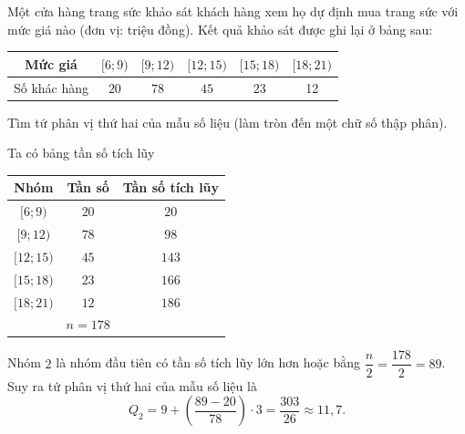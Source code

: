 \begin{bt}%
	Một cửa hàng trang sức khảo sát khách hàng xem họ dự định mua trang sức với mức giá nào (đơn vị: triệu đồng). Kết quả khảo sát được ghi lại ở bảng sau:
	\begin{center}
		\begin{tabular}{|c|c|c|c|c|c|}
			\hline Mức giá & {$[6 ; 9)$} & {$[9 ; 12)$} & {$[12 ; 15)$} & {$[15 ; 18)$} & {$[18 ; 21)$} \\
			\hline Số khác hàng & $20$ & $78$ & $45$ & $23$ & 12 \\
			\hline
		\end{tabular}
	\end{center}
	Tìm tứ phân vị thứ hai của mẫu số liệu (làm tròn đến một chữ số thập phân).
	\loigiai
	{ Ta có bảng tần số tích lũy
		\begin{center}
			\begin{tabular}{|c|c|c|}
				\hline Nhóm & Tần số & Tần số tích lũy \\
				\hline$[6 ; 9)$ & $20$ & $20$ \\
				\hline$[9 ; 12)$ & $78$ & $98$ \\
				\hline$[12 ; 15)$ & $45$ & $143$ \\
				\hline$[15 ; 18)$ & $23$ & $166$ \\
				\hline$[18 ; 21)$ & $12$ & $186$ \\
				\hline & $n=178$ & \\
				\hline
			\end{tabular}
		\end{center}
		Nhóm $2$ là nhóm đầu tiên có tần số tích lũy lớn hơn hoặc bằng $\dfrac{n}{2}=\dfrac{178}{2}=89$.\\
		Suy ra tứ phân vị thứ hai của mẫu số liệu là
		$$
		Q_2=9+\left(\dfrac{89-20}{78}\right) \cdot 3=\dfrac{303}{26}\approx 11{,}7 .
		$$
	}
\end{bt}

